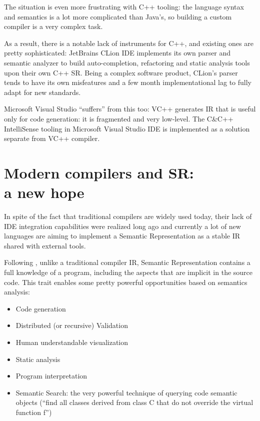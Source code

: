 The situation is even more frustrating with C++ tooling: the language syntax
and semantics is a lot more complicated than Java’s, so building a custom
compiler is a very complex task.

As a result, there is a notable lack of instruments for C++\cite{Zouev2010}, and existing
ones are pretty sophisticated: JetBrains CLion IDE implements its own parser
and semantic analyzer to build auto-completion, refactoring and static analysis
tools upon their own C++ SR. Being a complex software product, CLion’s parser
tends to have its own misfeatures and a few month implementational lag to
fully adapt for new standards.


Microsoft Visual Studio “suffers” from this too: VC++ generates IR that is useful
only for code generation: it is fragmented and very low-level.
The C\&C++ IntelliSense tooling in Microsoft Visual Studio IDE is implemented
as a solution separate from VC++ compiler.

\newpage

\section{Modern compilers and SR: \\a new hope}
\label{sec:review_2}

In spite of the fact that traditional compilers are widely used today, their lack of
IDE integration capabilities were realized long ago and currently a lot of new
languages are aiming to implement a Semantic Representation as a stable IR
shared with external tools.

Following \cite{Zouev2005, Zouev2010}, unlike a traditional compiler IR, Semantic Representation contains a full
knowledge of a program, including the aspects that are implicit in the source
code. This trait enables some pretty powerful opportunities based on
semantics analysis:

\begin{itemize}
    \item Code generation
    \item Distributed (or recursive) Validation
    \item Human understandable visualization
    \item Static analysis
    \item Program interpretation
    \item Semantic Search: the very powerful technique of querying code semantic objects (“find all classes derived from class C that do not override the virtual function f”)    
\end{itemize}

